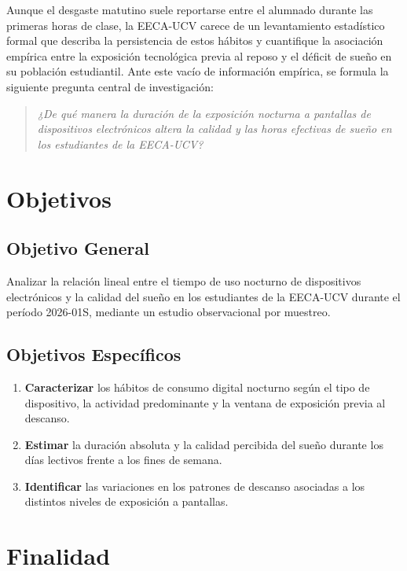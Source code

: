\documentclass[12pt, letterpaper]{article}
\begin{document}
Aunque el desgaste matutino suele reportarse entre el alumnado durante las primeras horas de clase, la EECA-UCV carece de un levantamiento estadístico formal que describa la persistencia de estos hábitos y cuantifique la asociación empírica entre la exposición tecnológica previa al reposo y el déficit de sueño en su población estudiantil. Ante este vacío de información empírica, se formula la siguiente pregunta central de investigación:

\begin{quote}
\textit{¿De qué manera la duración de la exposición nocturna a pantallas de dispositivos electrónicos altera la calidad y las horas efectivas de sueño en los estudiantes de la EECA-UCV?}
\end{quote}


\section{Objetivos}

\subsection{Objetivo General}
Analizar la relación lineal entre el tiempo de uso nocturno de dispositivos electrónicos y la calidad del sueño en los estudiantes de la EECA-UCV durante el período 2026-01S, mediante un estudio observacional por muestreo.

\subsection{Objetivos Específicos}
\begin{enumerate}
    \item \textbf{Caracterizar} los hábitos de consumo digital nocturno según el tipo de dispositivo, la actividad predominante y la ventana de exposición previa al descanso.
    \item \textbf{Estimar} la duración absoluta y la calidad percibida del sueño durante los días lectivos frente a los fines de semana.
    \item \textbf{Identificar} las variaciones en los patrones de descanso asociadas a los distintos niveles de exposición a pantallas.
\end{enumerate}


\section{Finalidad}
\end{document}
